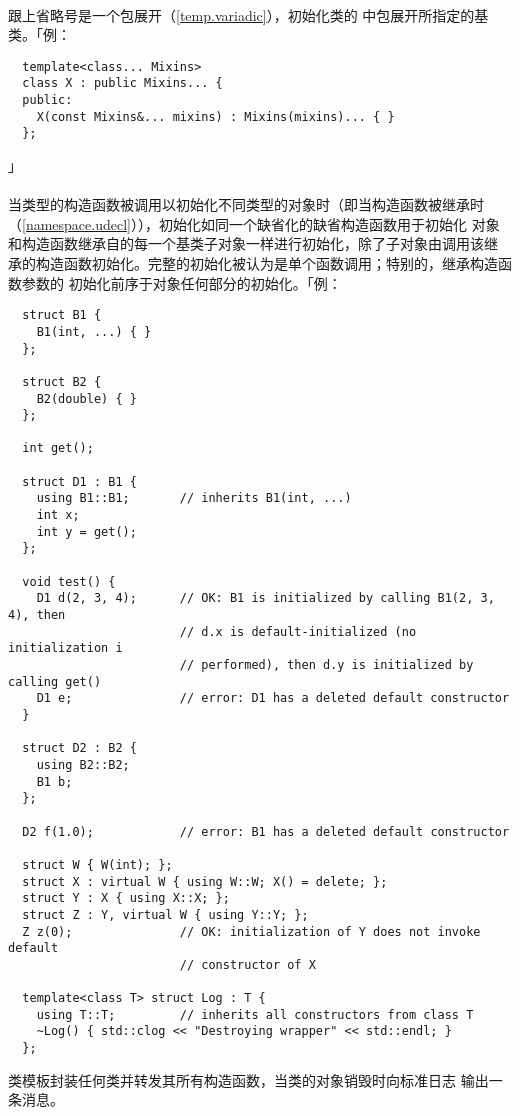 \paragraph{}
跟上省略号是一个包展开（\ref{temp.variadic}），初始化类的
中包展开所指定的基类。「例：
\begin{lstlisting}
  template<class... Mixins>
  class X : public Mixins... {
  public:
    X(const Mixins&... mixins) : Mixins(mixins)... { }
  };
\end{lstlisting}」

\paragraph{}
当类型的构造函数被调用以初始化不同类型的对象时（即当构造函数被继承时
（\ref{namespace.udecl}）），初始化如同一个缺省化的缺省构造函数用于初始化
对象和构造函数继承自的每一个基类子对象一样进行初始化，除了子对象由调用该继
承的构造函数初始化。完整的初始化被认为是单个函数调用；特别的，继承构造函数参数的
初始化前序于对象任何部分的初始化。「例：
\begin{lstlisting}
  struct B1 {
    B1(int, ...) { }
  };

  struct B2 {
    B2(double) { }
  };

  int get();

  struct D1 : B1 {
    using B1::B1;       // inherits B1(int, ...)
    int x;
    int y = get();
  };

  void test() {
    D1 d(2, 3, 4);      // OK: B1 is initialized by calling B1(2, 3, 4), then
                        // d.x is default-initialized (no initialization i
                        // performed), then d.y is initialized by calling get()
    D1 e;               // error: D1 has a deleted default constructor
  }

  struct D2 : B2 {
    using B2::B2;
    B1 b;
  };

  D2 f(1.0);            // error: B1 has a deleted default constructor

  struct W { W(int); };
  struct X : virtual W { using W::W; X() = delete; };
  struct Y : X { using X::X; };
  struct Z : Y, virtual W { using Y::Y; };
  Z z(0);               // OK: initialization of Y does not invoke default
                        // constructor of X

  template<class T> struct Log : T {
    using T::T;         // inherits all constructors from class T
    ~Log() { std::clog << "Destroying wrapper" << std::endl; }
  };
\end{lstlisting}
类模板封装任何类并转发其所有构造函数，当类的对象销毁时向标准日志
输出一条消息。

